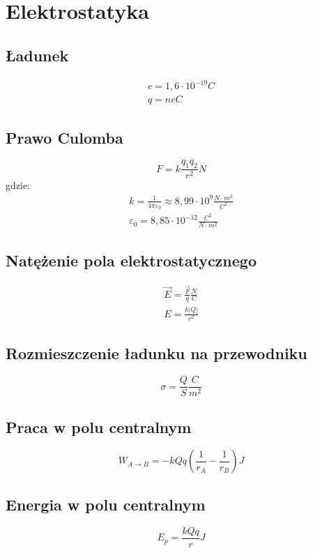   \chapter{Elektrostatyka}
    \section{Ładunek}
      \begin{gather}
        e = 1,6\cdot 10^{-19} \unit{C}\\
        q = ne \unit{C}
      \end{gather}
    \section{Prawo Culomba}
      \begin{equation}
        F = k\frac{q_1q_2}{r^2} \unit{N}
      \end{equation}
      gdzie:
      \begin{gather}
        k = \frac{1}{4\pi\varepsilon_0} \approx 8,99\cdot 10^9 \unit{\frac{N\cdot m^2}{C^2}}\\
        \varepsilon_0 = 8,85\cdot 10^{-12} \unit{\frac{C^2}{N\cdot m^2}}
      \end{gather}
    \section{Natężenie pola elektrostatycznego}
      \begin{gather}
        \vec E = \frac{\vec F}{q} \unit{\frac{N}{C}}\\
        E = \frac{k|Q|}{r^2}
      \end{gather}
    \section{Rozmieszczenie ładunku na przewodniku}
      \begin{equation}
        \sigma = \frac{Q}{S} \unit{\frac{C}{m^2}}
      \end{equation}
    \section{Praca w polu centralnym}
      \begin{equation}
        W_{A\rightarrow B} = -kQq\left(\frac{1}{r_A} - \frac{1}{r_B}\right) \unit{J}
      \end{equation}
    \section{Energia w polu centralnym}
      \begin{equation}
        E_p = \frac{kQq}{r} \unit{J}
      \end{equation}
